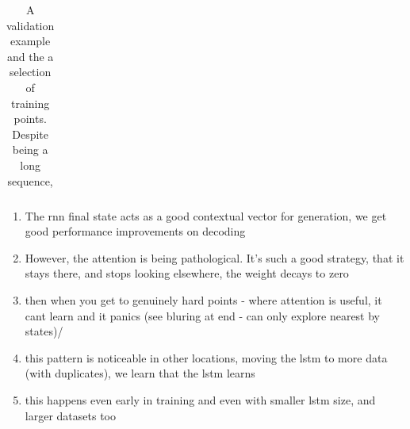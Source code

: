 \begin{table}
\begin{center}
\begin{tabular}{l}
\end{tabular}

\caption{A validation example and the a selection of training points. Despite being a long sequence, }
\end{center}
\end{table}

\begin{enumerate}
    \item The rnn final state acts as a good contextual vector for generation, we get good performance improvements on decoding
    \item However, the attention is being pathological. It's such a good strategy, that it stays there, and stops looking elsewhere, the weight decays to zero
    \item then when you get to genuinely hard points - where attention is useful, it cant learn and it panics (see bluring at end - can only explore nearest by states)/
    \item this pattern is noticeable in other locations, moving the lstm to more data (with duplicates), we learn that the lstm learns
    \item this happens even early in training and even with smaller lstm size, and larger datasets too
\end{enumerate}


